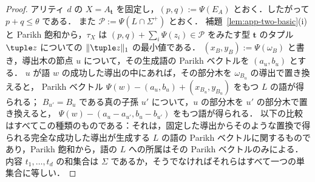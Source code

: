 \begin{proof}
アリティ $d$ の $X=A_{\mathbf t}$ を固定し，$(p,q):=\Psi(E_A)$ とおく．したがって $p+q\le\theta$ である．
また $\mathcal P:=\Psi(L\cap\Sigma^+)$ とおく．
補題~\ref{lem:app-two-basic}(i) と Parikh 飽和から，$\tau_X$ は
$(p,q)+\sum_i\Psi(z_i)\in\mathcal P$ をみたす型 $\mathbf t$ のタプル $\tuple z$ についての $\|\tuple z\|_1$ の最小値である．
$(x_B,y_B):=\Psi(\omega_B)$ と書き，導出木の節点 $u$ について，その生成語の Parikh ベクトルを $(a_u,b_u)$ とする．
$u$ が語 $w$ の成功した導出の中にあれば，その部分木を $\omega_{B_u}$ の導出で置き換えると，
Parikh ベクトル $\Psi(w)-(a_u,b_u)+(x_{B_u},y_{B_u})$ をもつ $L$ の語が得られる；
$B_{u'}=B_u$ である真の子孫 $u'$ について，$u$ の部分木を $u'$ の部分木で置き換えると，
$\Psi(w)-(a_u-a_{u'},b_u-b_{u'})$ をもつ語が得られる．
以下の比較はすべてこの種類のものである：それは，固定した導出からそのような置換で得られる完全な成功した導出が生成する $L$ の語の
Parikh ベクトルに関するものであり，Parikh 飽和から，語の $L$ への所属はその Parikh ベクトルのみによる．
内容 $t_1,\dots,t_d$ の和集合は $\Sigma$ であるか，そうでなければそれらはすべて一つの単集合に等しい．


\end{proof}
